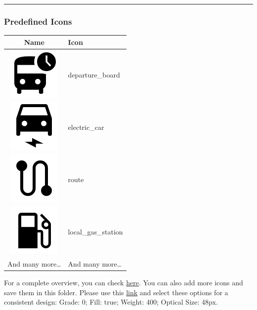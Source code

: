 \begin{center}\rule{0.5\linewidth}{0.5pt}\end{center}

\hypertarget{predefined-icons}{%
\subsubsection{Predefined Icons}\label{predefined-icons}}

\begin{longtable}[]{@{}cl@{}}
\toprule()
Name & Icon \\
\midrule()
\endhead
\includegraphics{assets/departure_board.svg} & departure\_board \\
\includegraphics{assets/electric_car.svg} & electric\_car \\
\includegraphics{assets/route.svg} & route \\
\includegraphics{assets/local_gas_station.svg} & local\_gas\_station \\
And many more\ldots{} & And many more\ldots{} \\
\bottomrule()
\end{longtable}

For a complete overview, you can check
\href{https://github.com/simwrapper/simwrapper/tree/overview-panel/src/assets/tile-icons}{here}.
You can also add more icons and save them in this folder. Please use
this \href{https://fonts.google.com/icons}{link} and select these
options for a consistent design: Grade: 0; Fill: true; Weight: 400;
Optical Size: 48px.

